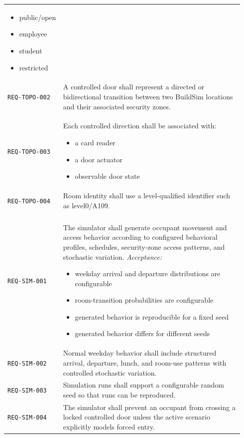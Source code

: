 \documentclass[11pt]{article}
\providecommand{\tightlist}{\setlength{\itemsep}{0pt}\setlength{\parskip}{0pt}}
\begin{document}
\begin{longtable}[]{@{}
>{\raggedright\arraybackslash}p{0.18\linewidth}
>{\raggedright\arraybackslash}p{0.76\linewidth}@{}}
\begin{itemize}
\item public/open
\item employee
\item student
\item restricted
\end{itemize} \\
\addlinespace[3pt]
\texttt{REQ-TOPO-002} & A controlled door shall represent a directed or bidirectional transition between two BuildSim locations and their associated security zones. \\
\addlinespace[3pt]
\texttt{REQ-TOPO-003} & Each controlled direction shall be associated with:
\begin{itemize}\tightlist
\item a card reader
\item a door actuator
\item observable door state
\end{itemize} \\
\addlinespace[3pt]
\texttt{REQ-TOPO-004} & Room identity shall use a level-qualified identifier such as level0/A109. \\
\addlinespace[3pt]
\multicolumn{2}{@{}l}{\textbf{Simulation requirements}} \\[2pt]
\texttt{REQ-SIM-001} & The simulator shall generate occupant movement and access behavior according to configured behavioral profiles, schedules, security-zone access patterns, and stochastic variation.
\textit{Acceptance:}
\begin{itemize}\tightlist
\item weekday arrival and departure distributions are configurable
\item room-transition probabilities are configurable
\item generated behavior is reproducible for a fixed seed
\item generated behavior differs for different seeds
\end{itemize} \\
\addlinespace[3pt]
\texttt{REQ-SIM-002} & Normal weekday behavior shall include structured arrival, departure, lunch, and room-use patterns with controlled stochastic variation. \\
\addlinespace[3pt]
\texttt{REQ-SIM-003} & Simulation runs shall support a configurable random seed so that runs can be reproduced. \\
\addlinespace[3pt]
\texttt{REQ-SIM-004} & The simulator shall prevent an occupant from crossing a locked controlled door unless the active scenario explicitly models forced entry. \\

\end{longtable}
\end{document}
